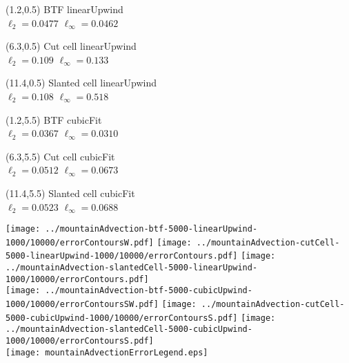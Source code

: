 \documentclass{article}
\begin{document}
\TPMargin{1pt}
\begin{textblock}{4}(1.2,0.5)
\normalsize
BTF linearUpwind \\
\hspace*{1.4em}$\ell_2 = \num{0.0477}$
\hspace*{1em}$\ell_\infty = \num{0.0462}$
\end{textblock}
\begin{textblock}{4}(6.3,0.5)
\normalsize
Cut cell linearUpwind \\
\hspace*{1.4em}$\ell_2 = \num{0.109}$
\hspace*{1em}$\ell_\infty = \num{0.133}$
\end{textblock}
\begin{textblock}{4}(11.4,0.5)
\normalsize
Slanted cell linearUpwind \\
\hspace*{1.4em}$\ell_2 = \num{0.108}$
\hspace*{1em}$\ell_\infty = \num{0.518}$
\end{textblock}
\begin{textblock}{4}(1.2,5.5)
\normalsize
BTF cubicFit \\
\hspace*{1.4em}$\ell_2 = \num{0.0367}$
\hspace*{1em}$\ell_\infty = \num{0.0310}$
\end{textblock}
\begin{textblock}{4}(6.3,5.5)
\normalsize
Cut cell cubicFit \\
\hspace*{1.4em}$\ell_2 = \num{0.0512}$
\hspace*{1em}$\ell_\infty = \num{0.0673}$
\end{textblock}
\begin{textblock}{4}(11.4,5.5)
\normalsize
Slanted cell cubicFit \\
\hspace*{1.4em}$\ell_2 = \num{0.0523}$
\hspace*{1em}$\ell_\infty = \num{0.0688}$
\end{textblock}
\begin{center}
\texttt{[image: ../mountainAdvection-btf-5000-linearUpwind-1000/10000/errorContoursW.pdf]}
\hspace*{0.26em}
\texttt{[image: ../mountainAdvection-cutCell-5000-linearUpwind-1000/10000/errorContours.pdf]}
\hspace*{0.26em}
\texttt{[image: ../mountainAdvection-slantedCell-5000-linearUpwind-1000/10000/errorContours.pdf]} \\
\texttt{[image: ../mountainAdvection-btf-5000-cubicUpwind-1000/10000/errorContoursSW.pdf]}
\texttt{[image: ../mountainAdvection-cutCell-5000-cubicUpwind-1000/10000/errorContoursS.pdf]}
\texttt{[image: ../mountainAdvection-slantedCell-5000-cubicUpwind-1000/10000/errorContoursS.pdf]} \\
\texttt{[image: mountainAdvectionErrorLegend.eps]}
\end{center}
\hspace*{0.5em}
\end{document}
